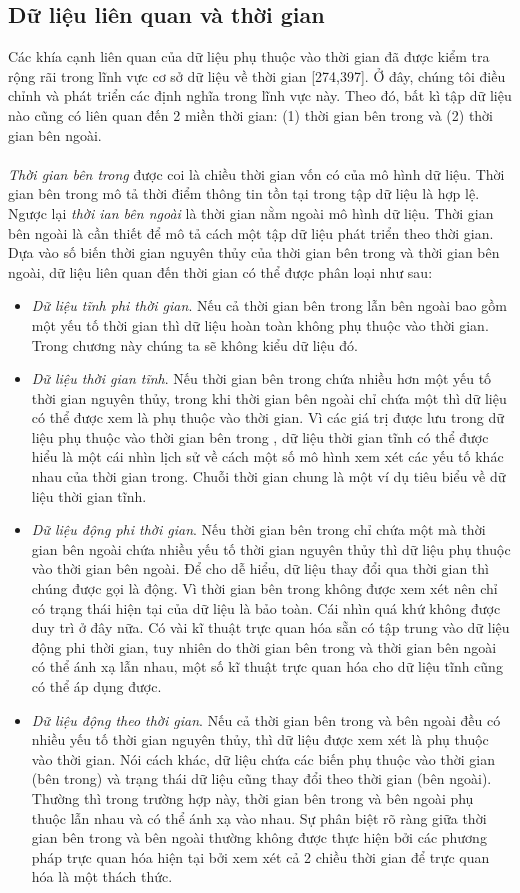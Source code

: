 \subsection{Dữ liệu liên quan và thời gian}
Các khía cạnh liên quan của dữ liệu phụ thuộc vào thời gian đã được kiểm tra rộng rãi trong lĩnh vực cơ sở dữ liệu về thời gian [274,397]. Ở đây, chúng tôi điều chỉnh và phát triển các định nghĩa trong lĩnh vực này. Theo đó, bất kì tập dữ liệu nào cũng có liên quan đến 2 miền thời gian: (1) thời gian bên trong và (2) thời gian bên ngoài. 
\\ \\
\textit{Thời gian bên trong} được coi là chiều thời gian vốn có của mô hình dữ liệu. Thời gian bên trong mô tả thời điểm thông tin tồn tại trong tập dữ liệu là hợp lệ. Ngược lại \textit{thời ian bên ngoài} là thời gian nằm ngoài mô hình dữ liệu. Thời gian bên ngoài là cần thiết để mô tả cách một tập dữ liệu phát triển theo thời gian. Dựa vào số biến thời gian nguyên thủy của thời gian bên trong và thời gian bên ngoài, dữ liệu liên quan đến thời gian có thể được phân loại như sau:
\begin{itemize}
    \item \textit{Dữ liệu tĩnh phi thời gian}. Nếu cả thời gian bên trong lẫn bên ngoài bao gồm một yếu tố thời gian thì dữ liệu hoàn toàn không phụ thuộc vào thời gian. Trong chương này chúng ta sẽ không kiểu dữ liệu đó.
    \item \textit{Dữ liệu thời gian tĩnh}. Nếu thời gian bên trong chứa nhiều hơn một yếu tố thời gian nguyên thủy, trong khi thời gian bên ngoài chỉ chứa một thì dữ liệu có thể được xem là phụ thuộc vào thời gian. Vì các giá trị được lưu trong dữ liệu phụ thuộc vào thời gian bên trong , dữ liệu thời gian tĩnh có thể được hiểu là một cái nhìn lịch sử về cách một số mô hình xem xét các yếu tố khác nhau của thời gian trong. Chuỗi thời gian chung là một ví dụ tiêu biểu về dữ liệu thời gian tĩnh. 
    \item \textit{Dữ liệu động phi thời gian}. Nếu thời gian bên trong chỉ chứa một mà thời gian bên ngoài chứa nhiều yếu tố thời gian nguyên thủy thì dữ liệu phụ thuộc vào thời gian bên ngoài. Để cho dễ hiểu, dữ liệu thay đổi qua thời gian thì chúng được gọi là động. Vì thời gian bên trong không được xem xét nên chỉ có trạng thái hiện tại của dữ liệu là bảo toàn. Cái nhìn quá khứ không được duy trì ở đây nữa. Có vài kĩ thuật trực quan hóa sẵn có tập trung vào dữ liệu động phi thời gian, tuy nhiên do thời gian bên trong và thời gian bên ngoài có thể ánh xạ lẫn nhau, một số kĩ thuật trực quan hóa cho dữ liệu tĩnh cũng có thể áp dụng được.
    \item \textit{Dữ liệu động theo thời gian}. Nếu cả thời gian bên trong và bên ngoài đều có nhiều yếu tố thời gian nguyên thủy, thì dữ liệu được xem xét là phụ thuộc vào thời gian. Nói cách khác, dữ liệu chứa các biến phụ thuộc vào thời gian (bên trong) và trạng thái dữ liệu cũng thay đổi theo thời gian (bên ngoài). Thường thì trong trường hợp này, thời gian bên trong và bên ngoài phụ thuộc lẫn nhau và có thể ánh xạ vào nhau. Sự phân biệt rõ ràng giữa thời gian bên trong và bên ngoài thường không được thực hiện bởi các phương pháp trực quan hóa hiện tại bởi xem xét cả 2 chiều thời gian để trực quan hóa là một thách thức.
\end{itemize}
